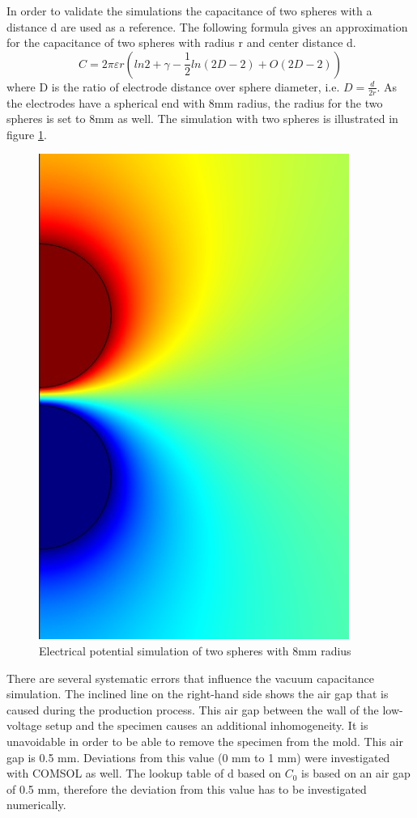 In order to validate the simulations the capacitance of two spheres with a distance d are used as a reference. The following formula gives an approximation for the capacitance of two spheres with radius r and center distance d. \cite{Rawlins}
\begin{equation}
C=2 \pi \varepsilon r ( ln 2 + \gamma -\frac{1}{2} ln(2D-2)+O(2D-2))
\end{equation}
where D is the ratio of electrode distance over sphere diameter, i.e. $ D=\frac{d}{2r}$. As the electrodes have a spherical end with 8mm radius, the radius for the two spheres is set to 8mm as well. The simulation with two spheres is illustrated in figure \ref{fig.twospheres}.  
\begin{figure}[htbp]
	\centering
	\includegraphics[scale=0.3]{figures/Method/Part1_d_C0/sphere_capacity.jpg}		
	\caption[Kurze Abbildungsbeschreibung]{Electrical potential simulation of two spheres with 8mm radius } \label{fig.comsol_sphere}
	\label{fig.twospheres}
\end{figure}


 There are several systematic errors that influence the vacuum capacitance simulation. The inclined line on the right-hand side shows the air gap that is caused during the production process. This air gap between the wall of the low-voltage setup and the specimen causes an additional inhomogeneity. It is unavoidable in order to be able to remove the specimen from the mold. This air gap is 0.5 mm. Deviations from this value (0 mm to 1 mm) were investigated with COMSOL as well. The lookup table of d based on $C_0$ is based on an air gap of 0.5 mm, therefore the deviation from this value has to be investigated numerically.
 
